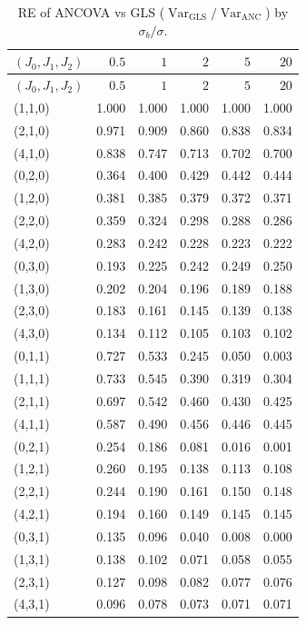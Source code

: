 \documentclass[
  11pt,
]{article}
\begin{document}
\begin{longtable}[]{@{}lrrrrr@{}}
\caption{RE of ANCOVA vs GLS
(\(\mathop{\mathrm{Var}}_{\text{GLS}} / \mathop{\mathrm{Var}}_{\text{ANC}}\))
by \(\sigma_b/\sigma\).}\tabularnewline
\toprule\noalign{}
\((J_0,J_1,J_2)\) & \(0.5\) & \(1\) & \(2\) & \(5\) & \(20\) \\
\midrule\noalign{}
\endfirsthead
\toprule\noalign{}
\((J_0,J_1,J_2)\) & \(0.5\) & \(1\) & \(2\) & \(5\) & \(20\) \\
\midrule\noalign{}
\endhead
\bottomrule\noalign{}
\endlastfoot
(1,1,0) & 1.000 & 1.000 & 1.000 & 1.000 & 1.000 \\
(2,1,0) & 0.971 & 0.909 & 0.860 & 0.838 & 0.834 \\
(4,1,0) & 0.838 & 0.747 & 0.713 & 0.702 & 0.700 \\
(0,2,0) & 0.364 & 0.400 & 0.429 & 0.442 & 0.444 \\
(1,2,0) & 0.381 & 0.385 & 0.379 & 0.372 & 0.371 \\
(2,2,0) & 0.359 & 0.324 & 0.298 & 0.288 & 0.286 \\
(4,2,0) & 0.283 & 0.242 & 0.228 & 0.223 & 0.222 \\
(0,3,0) & 0.193 & 0.225 & 0.242 & 0.249 & 0.250 \\
(1,3,0) & 0.202 & 0.204 & 0.196 & 0.189 & 0.188 \\
(2,3,0) & 0.183 & 0.161 & 0.145 & 0.139 & 0.138 \\
(4,3,0) & 0.134 & 0.112 & 0.105 & 0.103 & 0.102 \\
(0,1,1) & 0.727 & 0.533 & 0.245 & 0.050 & 0.003 \\
(1,1,1) & 0.733 & 0.545 & 0.390 & 0.319 & 0.304 \\
(2,1,1) & 0.697 & 0.542 & 0.460 & 0.430 & 0.425 \\
(4,1,1) & 0.587 & 0.490 & 0.456 & 0.446 & 0.445 \\
(0,2,1) & 0.254 & 0.186 & 0.081 & 0.016 & 0.001 \\
(1,2,1) & 0.260 & 0.195 & 0.138 & 0.113 & 0.108 \\
(2,2,1) & 0.244 & 0.190 & 0.161 & 0.150 & 0.148 \\
(4,2,1) & 0.194 & 0.160 & 0.149 & 0.145 & 0.145 \\
(0,3,1) & 0.135 & 0.096 & 0.040 & 0.008 & 0.000 \\
(1,3,1) & 0.138 & 0.102 & 0.071 & 0.058 & 0.055 \\
(2,3,1) & 0.127 & 0.098 & 0.082 & 0.077 & 0.076 \\
(4,3,1) & 0.096 & 0.078 & 0.073 & 0.071 & 0.071 \\
\end{longtable}
\end{document}
